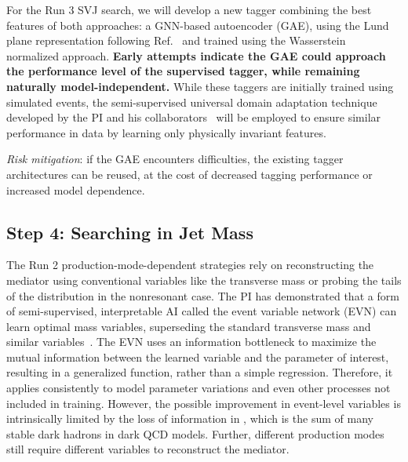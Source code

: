For the Run 3 SVJ search, we will develop a new tagger combining the best features of both approaches:
a GNN-based autoencoder (GAE), using the Lund plane representation following Ref.~\cite{Dreyer:2020brq} and trained using the Wasserstein normalized approach.
\textbf{Early attempts indicate the GAE could approach the performance level of the supervised tagger, while remaining naturally model-independent.}
While these taggers are initially trained using simulated events,
the semi-supervised universal domain adaptation technique developed by the PI and his collaborators~\cite{Ciprijanovic:2023hrw}
will be employed to ensure similar performance in data by learning only physically invariant features.

\textit{Risk mitigation}: if the GAE encounters difficulties, the existing tagger architectures can be reused, at the cost of decreased tagging performance or increased model dependence.

\subsection{Step 4: Searching in Jet Mass}\label{subsec:strategy}

The Run 2 production-mode-dependent strategies rely on reconstructing the mediator using conventional variables like the transverse mass
or probing the tails of the \ptmiss distribution in the nonresonant case.
The PI has demonstrated that a form of semi-supervised, interpretable AI called the event variable network (EVN)
can learn optimal mass variables, superseding the standard transverse mass and similar variables~\cite{Pedro:2023sdp}.
The EVN uses an information bottleneck to maximize the mutual information between the learned variable and the parameter of interest,
resulting in a generalized function, rather than a simple regression.
Therefore, it applies consistently to model parameter variations and even other processes not included in training.
However, the possible improvement in event-level variables is intrinsically limited by the loss of information in \ptmiss,
which is the sum of many stable dark hadrons in dark QCD models.
Further, different production modes still require different variables to reconstruct the mediator.


